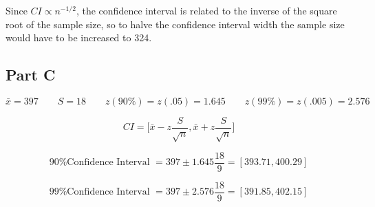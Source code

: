 \documentclass[letterpaper]{article}
\begin{document}
Since $CI \propto n^{-1/2}$, the confidence interval is related to the inverse of the square root of the sample size, so to halve the confidence interval width the sample size would have to be increased to 324.

\subsection*{Part C}

$$\bar{x} = 397 \qquad S = 18 \qquad z(90\%) = z(.05) = 1.645 \qquad z(99\%) = z(.005) = 2.576$$

$$CI = \Big[ \bar{x} - z \frac{S}{\sqrt{n}}, \bar{x} + z \frac{S}{\sqrt{n}}\Big]$$

$$\text{90\% Confidence Interval } = 397 \pm 1.645 \frac{18}{9} = [393.71, 400.29]$$

$$\text{99\% Confidence Interval } = 397 \pm 2.576 \frac{18}{9} = [391.85, 402.15]$$
\end{document}
